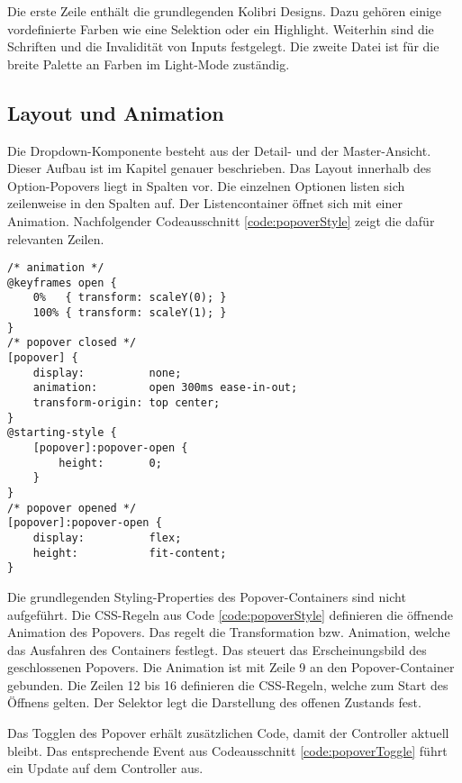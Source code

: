 Die erste Zeile enthält die grundlegenden Kolibri Designs. 
Dazu gehören einige vordefinierte Farben wie eine Selektion oder ein Highlight. 
Weiterhin sind die Schriften und die Invalidität von Inputs festgelegt. 
Die zweite Datei ist für die breite Palette an Farben im Light-Mode zuständig. 


\subsection{Layout und Animation}
\label{sec:layoutTypo}

Die Dropdown-Komponente besteht aus der Detail- und der Master-Ansicht. 
Dieser Aufbau ist im Kapitel \textbf{} genauer beschrieben. 
Das Layout innerhalb des Option-Popovers liegt in Spalten vor. 
Die einzelnen Optionen listen sich zeilenweise in den Spalten auf. 
Der Listencontainer öffnet sich mit einer Animation. 
Nachfolgender Codeausschnitt \ref{code:popoverStyle} zeigt die dafür relevanten Zeilen. 

\begin{lstlisting}[style = htmlcssjs, caption = Animation zum Öffnen des Popovers, label = code:popoverStyle]
/* animation */
@keyframes open {
    0%   { transform: scaleY(0); }
    100% { transform: scaleY(1); }
}
/* popover closed */
[popover] {
    display:          none;
    animation:        open 300ms ease-in-out;
    transform-origin: top center;
}
@starting-style {
    [popover]:popover-open {
        height:       0;
    }
}
/* popover opened */
[popover]:popover-open {
    display:          flex;
    height:           fit-content;
}
\end{lstlisting}

Die grundlegenden Styling-Properties des Popover-Containers sind nicht aufgeführt. 
Die CSS-Regeln aus Code \ref{code:popoverStyle} definieren die öffnende Animation des Popovers. 
Das  regelt die Transformation bzw. Animation, welche das Ausfahren des Containers festlegt. 
Das \codestyle{[popover]} steuert das Erscheinungsbild des geschlossenen Popovers. 
Die Animation ist mit Zeile 9 an den Popover-Container gebunden. 
Die Zeilen 12 bis 16 definieren die CSS-Regeln, welche zum Start des Öffnens gelten. 
Der Selektor  legt die Darstellung des offenen Zustands fest. 

Das Togglen des Popover erhält zusätzlichen Code, damit der Controller aktuell bleibt. 
Das entsprechende Event aus Codeausschnitt \ref{code:popoverToggle} führt ein Update auf dem Controller aus. 

